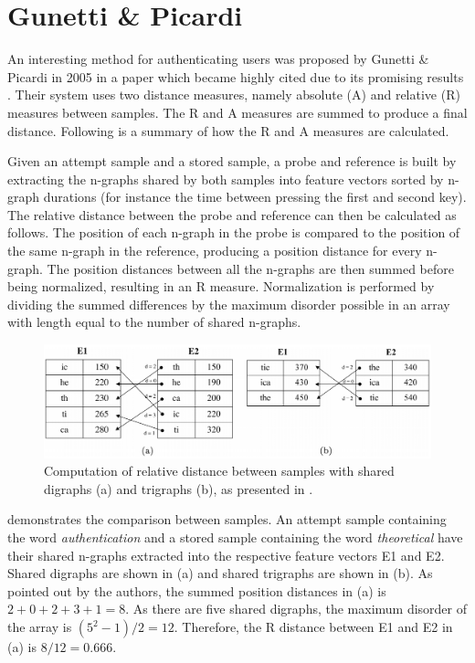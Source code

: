 \documentclass[informationsecurity]{gucmasterproject}
\begin{document}


\chapter{Gunetti \& Picardi}
\label{chap:gnp}
An interesting method for authenticating users was proposed by Gunetti \& Picardi in 2005 in a paper which became highly cited due to its promising results \cite{gnp}.
Their system uses two distance measures, namely absolute (A) and relative (R) measures between samples.
The R and A measures are summed to produce a final distance.
Following is a summary of how the R and A measures are calculated.

Given an attempt sample and a stored sample, a probe and reference is built by extracting the n-graphs shared by both samples into feature vectors sorted by n-graph durations (for instance the time between pressing the first and second key). 
The relative distance between the probe and reference can then be calculated as follows.
The position of each n-graph in the probe is compared to the position of the same n-graph in the reference, producing a position distance for every n-graph.
The position distances between all the n-graphs are then summed before being normalized, resulting in an R measure.
Normalization is performed by dividing the summed differences by the maximum disorder possible in an array with length equal to the number of shared n-graphs.

\begin{figure}[h]
    \centering
    \includegraphics[width=1\textwidth]{gunetti/R-measure}
    \caption{Computation of relative distance between samples with shared digraphs (a) and trigraphs (b), as presented in \cite{gnp}.}
    \label{fig:R-measure}
\end{figure}

 demonstrates the comparison between samples.
An attempt sample containing the word \textit{authentication} and a stored sample containing the word \textit{theoretical} have their shared n-graphs extracted into the respective feature vectors E1 and E2.
Shared digraphs are shown in (a) and shared trigraphs are shown in (b). 
As pointed out by the authors, the summed position distances in (a) is $2+0+2+3+1=8$.
As there are five shared digraphs, the maximum disorder of the array is $(5^2-1)/2=12$.
Therefore, the R distance between E1 and E2 in (a) is $8/12 = 0.666$.
\end{document}
